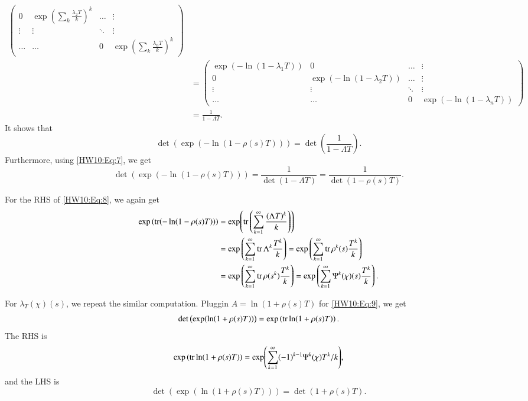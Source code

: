 \documentclass[a4paper, 12pt]{article}
\theoremstyle{Mydefinition}
\theoremstyle{Mytheorem}
\begin{document}
\begin{enumerate}
\begin{equation}
\begin{split}
\begin{pmatrix}
    0 & \exp\left(\sum_k\frac{\lambda_2 T}{k}\right)^k & \hdots &\vdots\\
    \vdots & \vdots & \ddots & \vdots\\
    \hdots & \hdots & 0 & \exp\left(\sum_k\frac{\lambda_n T}{k}\right)^k
    \end{pmatrix}\\
    &=\begin{pmatrix}\exp\left(-\ln(1-\lambda_1 T)\right) & 0& \hdots &\vdots\\
    0 & \exp\left(-\ln(1-\lambda_2 T)\right) & \hdots &\vdots\\
    \vdots & \vdots & \ddots & \vdots\\
    \hdots & \hdots & 0 & \exp\left(-\ln(1-\lambda_n T)\right)
    \end{pmatrix}\\
    &=\frac{1}{1-\Lambda T}.
\end{split}
\end{equation}
It shows that
\begin{equation}
    \det\left(\exp(-\ln (1-\rho(s)T))\right) = \det\left(\frac{1}{1-\Lambda T}\right).
\end{equation}
Furthermore, using \eqref{HW10:Eq:7}, we get
\begin{equation}
    \det\left(\exp(-\ln (1-\rho(s)T))\right) = \frac{1}{\det(1-\Lambda T)} = \frac{1}{\det(1-\rho(s) T)}.
\end{equation}

For the RHS of \eqref{HW10:Eq:8}, we again get
\begin{equation}
\begin{split}
    \exp\left(\tr (-\ln (1-\rho(s)T))\right) &= \exp(\tr\left(\sum_{k=1}^\infty \frac{(\Lambda T)^k}{k}\right))\\
    &=\exp\left(\sum_{k=1}^\infty \tr\Lambda^k \frac{T^k}{k}\right) = \exp\left(\sum_{k=1}^\infty \tr\rho^k(s) \frac{T^k}{k}\right)\\
    &=\exp\left(\sum_{k=1}^\infty \tr\rho(s^k) \frac{T^k}{k}\right)=\exp\left(\sum_{k=1}^\infty \Psi^k(\chi)(s) \frac{T^k}{k}\right).
\end{split}
\end{equation}

For $\lambda_T(\chi)(s)$, we repeat the similar computation. Pluggin $A=\ln(1+\rho(s)T)$ for \eqref{HW10:Eq:9}, we get
\begin{equation}
    \det\left(\exp(\ln(1+\rho(s)T))\right) = \exp\left(\tr \ln(1+\rho(s)T)\right).
\end{equation}
The RHS is
\begin{equation}
    \exp\left(\tr \ln(1+\rho(s)T)\right) = \exp(\sum_{k=1}^\infty (-1)^{k-1}\Psi^k(\chi)T^k/k),
\end{equation}
and the LHS is
\begin{equation}
    \det\left(\exp(\ln(1+\rho(s)T))\right) = \det(1+\rho(s)T).
\end{equation}


\end{enumerate}
\end{document}
